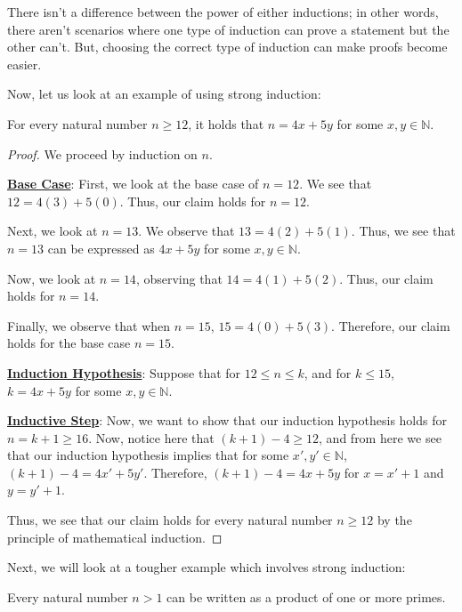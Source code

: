 \documentclass[openany]{book}
\newcommand{\NN}{\mathbb{N}}
\begin{document}
There isn't a difference between the power of either inductions; in other words, there aren't scenarios where one type of induction can prove a statement but the other can't. But, choosing the correct type of induction can make proofs become easier.

Now, let us look at an example of using strong induction:
\begin{theorem}
	For every natural number $n \geq 12$, it holds that $n = 4x+5y$ for some $x,y \in \mathbb{N}$.
\end{theorem}
\begin{proof}
	We proceed by induction on $n$.
	
	\underline{\textbf{Base Case}}: First, we look at the base case of $n=12$. We see that $12=4(3)+5(0)$. Thus, our claim holds for $n=12$.
	
	Next, we look at $n=13$. We observe that $13=4(2)+5(1)$. Thus, we see that $n=13$ can be expressed as $4x+5y$ for some $x,y\in \NN$.
	
	Now, we look at $n=14$, observing that $14=4(1)+5(2)$. Thus, our claim holds for $n=14$.
	
	Finally, we observe that when $n=15$, $15=4(0)+5(3)$. Therefore, our claim holds for the base case $n=15$.
	
	\underline{\textbf{Induction Hypothesis}}: Suppose that for $12 \leq n \leq k$, and for $k \leq 15$, $k=4x+5y$ for some $x,y \in \NN$.
	
	\underline{\textbf{Inductive Step}}: Now, we want to show that our induction hypothesis holds for $n=k+1 \geq 16$. Now, notice here that $(k+1)-4 \geq 12$, and from here we see that our induction hypothesis implies that for some $x', y' \in \NN$, $(k+1)-4 = 4x'+5y'$. Therefore, $(k+1)-4 = 4x + 5y$ for $x=x'+1$ and $y=y'+1$.
	
	Thus, we see that our claim holds for every natural number $n \geq 12$ by the principle of mathematical induction.
\end{proof}
	Next, we will look at a tougher example which involves strong induction:
	\begin{thm}
		Every natural number $n > 1$ can be written as a product of one or more primes.
	\end{thm}
\end{document}
